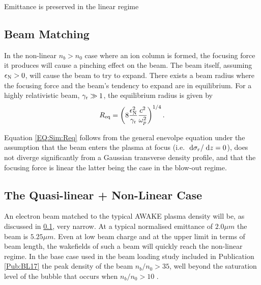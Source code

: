 Emittance is preserved in the linear regime


\subsection{Beam Matching}
\label{Sim:Match}

In the non-linear $n_{b} > n_{0}$ case where an ion column is formed, the focusing force it produces will cause a pinching effect on the beam. The beam itself, assuming $\epsilon_{\mathrm{N}} > 0$, will cause the beam to try to expand. There exists a beam radius where the focusing force and the beam's tendency to expand are in equilibrium. For a highly relativistic beam, $\gamma_{\mathrm{r}} \gg 1$, the equilibrium radius is given by \cite{krall:1995}
\begin{equation}
    R_{\mathrm{eq}} = \left( 8 \frac{\epsilon_{\mathrm{N}}^2}{\gamma_{\mathrm{r}}} \frac{c^2}{\omega_{p}^2} \right)^{1/4}. \label{EQ:Sim:Req}
\end{equation}

Equation \ref{EQ:Sim:Req} follows from the general enevolpe equation \cite{lee:1976} under the assumption that the beam enters the plasma at focus (i.e. $\;\mathrm{d}\sigma_{r}/\;\mathrm{d}z = 0$), does not diverge significantly from a Gaussian transverse density profile, and that the focusing force is linear \cite{krall:1995} \dash the latter being the case in the blow-out regime.


\subsection{The Quasi-linear + Non-Linear Case}
\label{Sim:QLinNonLin}

An electron beam matched to the typical AWAKE plasma density will be, as discussed in \ref{Sim:Match}, very narrow. At a typical normalised emittance of $2.0\unit{\mu m}$ the beam is $5.25\unit{\mu m}$. Even at low beam charge and at the upper limit in terms of beam length, the wakefields of such a beam will quickly reach the non-linear regime. In the base case used in the beam loading study included in Publication \ref{Pub:BL17} \cite{berglyd_olsen:2017a} the peak density of the beam $n_b/n_0 > 35$, well beyond the saturation level of the bubble that occurs when $n_b/n_0 > 10$ \cite{lu:2005}.

